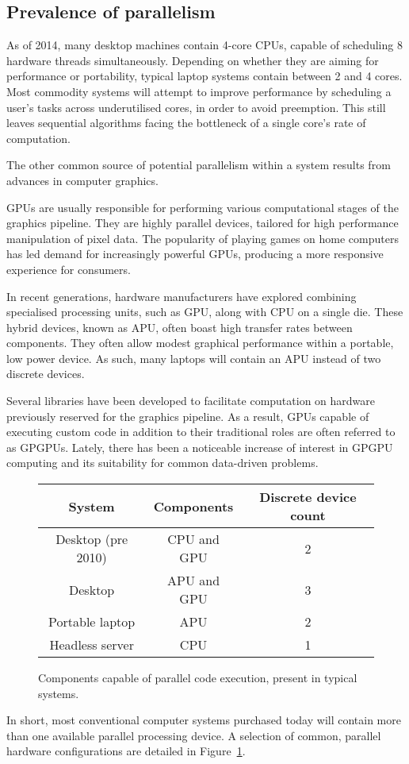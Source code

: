 \subsection{Prevalence of parallelism}
As of 2014, many desktop machines contain 4-core \acp{CPU}, capable of scheduling 8 hardware threads simultaneously.
Depending on whether they are aiming for performance or portability, typical laptop systems contain between 2 and 4 cores.
Most commodity systems will attempt to improve performance by scheduling a user's tasks across underutilised cores, in order to avoid preemption. This still leaves sequential algorithms facing the bottleneck of a single core's rate of computation.

The other common source of potential parallelism within a system results from advances in computer graphics.

\acp{GPU} are usually responsible for performing various computational stages of the graphics pipeline. They are highly parallel devices, tailored for high performance manipulation of pixel data. The popularity of playing games on home computers has led demand for increasingly powerful \acp{GPU}, producing a more responsive experience for consumers.

In recent generations, hardware manufacturers have explored combining specialised processing units, such as \ac{GPU}, along with \ac{CPU} on a single die. These hybrid devices, known as \ac{APU}, often boast high transfer rates between components. They often allow modest graphical performance within a portable, low power device. As such, many laptops will contain an \ac{APU} instead of two discrete devices.

Several libraries have been developed to facilitate computation on hardware previously reserved for the graphics pipeline. As a result, \acp{GPU} capable of executing custom code in addition to their traditional roles are often referred to as \acp{GPGPU}.
Lately, there has been a noticeable increase of interest in \ac{GPGPU} computing and its suitability for common data-driven problems.

\begin{figure}
\begin{center}
  \begin{tabular}{ | c | c | c |}
    \hline
    System & Components & Discrete device count \\ \hline
    Desktop (pre 2010) & \ac{CPU} and \ac{GPU} & 2 \\ \hline
    Desktop & \ac{APU} and \ac {GPU} & 3 \\ \hline
    Portable laptop & \ac{APU} & 2 \\ \hline
    Headless server & \ac{CPU} & 1 \\ \hline
    \end{tabular}
  \caption{Components capable of parallel code execution, present in typical systems.}
  \label{fig:par_table}
\end{center}
\end{figure}

In short, most conventional computer systems purchased today will contain more than one available parallel processing device. A selection of common, parallel hardware configurations are detailed in Figure~\ref{fig:par_table}.
